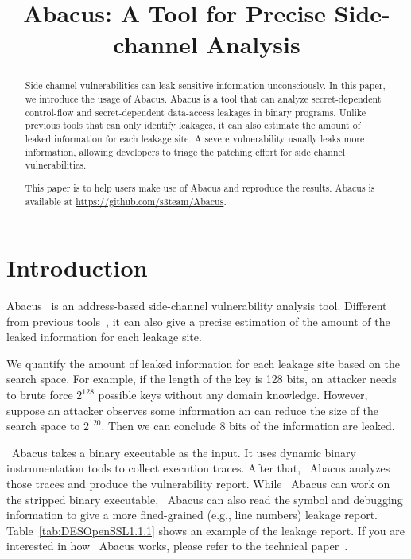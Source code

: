 \documentclass[10pt,conference]{IEEEtran}
\newcommand{\tool}{\textsf{Abacus}}
\begin{document}
\title{\tool{}: A Tool for Precise Side-channel Analysis}
\author{
}


\maketitle

\begin{abstract}
Side-channel vulnerabilities can leak sensitive information unconsciously. 
In this paper, we introduce the usage of Abacus. Abacus is a tool that can analyze secret-dependent control-flow and secret-dependent data-access leakages in binary programs. Unlike previous tools that can only identify leakages, it can also estimate the amount of leaked information for each leakage site. A severe vulnerability usually leaks more information, allowing developers to triage the patching effort for side channel vulnerabilities.

This paper is to help users make use of Abacus and reproduce the
results. Abacus is available at \url{https://github.com/s3team/Abacus}.
\end{abstract}

\IEEEpeerreviewmaketitle
{}
\pagestyle{plain}
\section{Introduction}


Abacus~\cite{bao2021abacus} is an address-based side-channel vulnerability analysis tool. Different from previous tools~\cite{203878,236338,182946}, it can also give a precise estimation of the amount of the leaked information for each leakage site.

We quantify the amount of leaked information for each leakage site based on the search space. For example, if the length of the key is 128 bits, an attacker needs to brute force $2^{128}$ possible keys without any domain knowledge. However, suppose an attacker observes some information an can reduce the size of the search space to $2^{120}$. Then we can conclude 8 bits of the information are leaked.

~\tool{} takes a binary executable as the input. It uses dynamic binary instrumentation tools to collect execution traces. After that, ~\tool{} analyzes those traces and produce the vulnerability report. While ~\tool{} can work on the stripped binary executable, ~\tool{} can also read the symbol and debugging information to give a more fined-grained (e.g., line numbers) leakage report. Table~\ref{tab:DESOpenSSL1.1.1} shows an example of the leakage report. If you are interested in how ~\tool{} works, please refer to the technical paper~\cite{bao2021abacus}.
\end{document}
